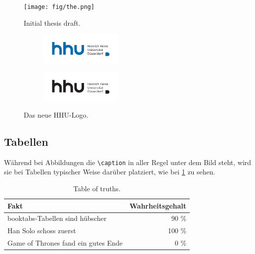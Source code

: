 \begin{figure}[h]
  \centering
  \texttt{[image: fig/the.png]}
  \caption{Initial thesis draft.}%
  \label{fig:initial-draft}
\end{figure}

\begin{figure}[h]
  \begin{subfigure}{.5\textwidth}
    \centering
    \includegraphics[width=4cm]{fig/hhu-logo-rgb.pdf}
    \label{fig:hhu-rgb}
  \end{subfigure}%
  \begin{subfigure}{.5\textwidth}
    \centering
    \includegraphics[width=4cm]{fig/hhu-logo-black.pdf}
    \label{fig:hhu-bw}
  \end{subfigure}%
  \caption{Das neue HHU-Logo.}%
  \label{fig:hhu-logo}
\end{figure}


\subsection{Tabellen}%
\label{sec:tables}

Während bei Abbildungen die \texttt{\textbackslash{}caption}
in aller Regel unter dem Bild steht,
wird sie bei Tabellen typischer Weise darüber platziert, wie bei
\cref{table:truths} zu sehen.

\begin{table}[ht]
  \begin{center}
    \caption{Table of truths.}%
    \label{table:truths}
    \begin{tabular}{lr}
      \toprule
      Fakt                                & Wahrheitsgehalt \\
      \midrule
      booktabs-Tabellen sind hübscher     & 90 \%           \\
      Han Solo schoss zuerst              & 100 \%          \\
      Game of Thrones fand ein gutes Ende & 0 \%            \\
      \bottomrule
    \end{tabular}
  \end{center}
\end{table}

